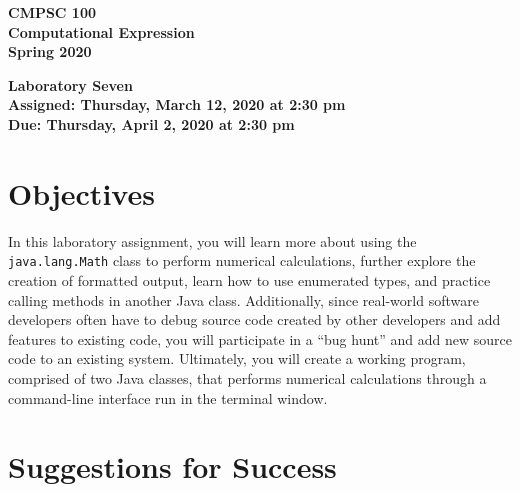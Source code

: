 \documentclass[11pt]{article}
\newcommand{\assignmentduedate}{April 2}
\newcommand{\assignmentassignedate}{March 12}
\newcommand{\assignmentnumber}{Seven}
\newcommand{\labyear}{2020}
\newcommand{\labday}{Thursday}
\newcommand{\labtime}{2:30 pm}
\newcommand{\assigneddate}{Assigned: \labday, \assignmentassignedate, \labyear{} at \labtime{}}
\newcommand{\duedate}{Due: \labday, \assignmentduedate, \labyear{} at \labtime{}}
\newcommand{\labtitle}[1]
{
  \begin{center}
    \begin{center}
      \bf
      CMPSC 100\\Computational Expression\\
      Spring 2020\\
      \medskip
    \end{center}
    \bf
    #1
  \end{center}
}
\begin{document}
\thispagestyle{empty}

\labtitle{Laboratory \assignmentnumber{} \\ \assigneddate{} \\ \duedate{}}

\section*{Objectives}

In this laboratory assignment, you will learn more about using the {\tt
java.lang.Math} class to perform numerical calculations, further explore the
creation of formatted output, learn how to use enumerated types, and practice
calling methods in another Java class. Additionally, since real-world software
developers often have to debug source code created by other developers and add
features to existing code, you will participate in a ``bug hunt'' and add new
source code to an existing system. Ultimately, you will create a working
program, comprised of two Java classes, that performs numerical calculations
through a command-line interface run in the terminal window.

\section*{Suggestions for Success}
\end{document}
